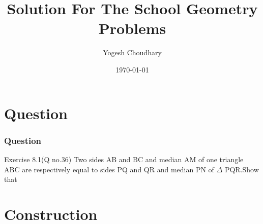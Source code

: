 \documentclass{beamer}
\title{Solution For The School Geometry Problems}
\author{Yogesh Choudhary}
\date{\today}
\begin{document}
\begin{frame}
\titlepage
\end{frame}
\section{Question}
\begin{frame}
\frametitle{Question}
\begin{block}{Exercise 8.1(Q no.36)}
Two sides AB and BC and median AM of one
triangle ABC are respectively equal to sides PQ
and QR and median PN of $\Delta$ PQR.Show that
\newline
\hyperlink{a}{}
\newline
\hyperlink{b}{}
\newline

\end{block}
\end{frame}

\section{\textbf{Construction}}
\end{document}
